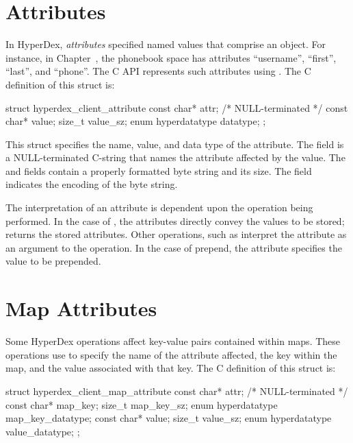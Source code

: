 \section{Attributes}
\label{sec:api:c:client:attributes}

In HyperDex, {\em attributes} specified named values that comprise an object.
For instance, in Chapter~, the phonebook space has
attributes ``username'', ``first'', ``last'', and ``phone''.  The C API
represents such attributes using .  The
C definition of this struct is:

\begin{ccode}
struct hyperdex_client_attribute
{
    const char* attr; /* NULL-terminated */
    const char* value;
    size_t value_sz;
    enum hyperdatatype datatype;
};
\end{ccode}

This struct specifies the name, value, and data type of the attribute.  The
 field is a NULL-terminated C-string that names the attribute
affected by the value.  The  and  fields contain a
properly formatted byte string and its size.  The  field
indicates the encoding of the byte string.

The interpretation of an attribute is dependent upon the operation being
performed.  In the case of , the attributes directly
convey the values to be stored;  returns the
stored attributes.  Other operations, such as
 interpret the attribute as an argument
to the operation.  In the case of prepend, the attribute specifies the value to
be prepended.

\section{Map Attributes}
\label{sec:api:c:client:map-attributes}

Some HyperDex operations affect key-value pairs contained within maps.  These
operations use  to specify the
name of the attribute affected, the key within the map, and the value associated
with that key.  The C definition of this struct is:

\begin{ccode}
struct hyperdex_client_map_attribute
{
    const char* attr; /* NULL-terminated */
    const char* map_key;
    size_t map_key_sz;
    enum hyperdatatype map_key_datatype;
    const char* value;
    size_t value_sz;
    enum hyperdatatype value_datatype;
};
\end{ccode}

